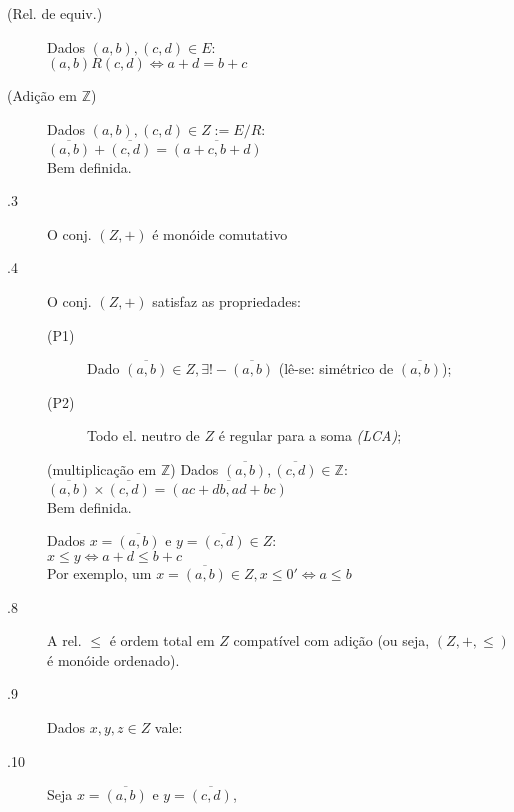 \documentclass[11pt]{article}
\newcommand{\Z}{\mathbb{Z}}
\begin{document}
\begin{description}
  \item[ (Rel. de equiv.)] Dados $(a,b),(c,d) \in E$: \\
    $(a,b)R(c,d) \iff a+d=b+c$
  \item[ (Adição em $\Z$)] Dados $(a,b),(c,d) \in Z := E/R$: \\
    $\overline{(a,b)} + \overline{(c,d)} = \overline{(a+c, b+d)}$ \\
    Bem definida.
  \item[.3] O conj. $(Z, +)$ é monóide comutativo
  \item[.4] O conj. $(Z, +)$ satisfaz as propriedades:
    \begin{description}
      \item[(P1)] Dado $\overline{(a,b)} \in Z, \exists ! -\overline{(a,b)}$
        (lê-se: simétrico de $\overline{(a,b)}$);
      \item[(P2)] Todo el. neutro de $Z$ é regular para a soma \emph{(LCA)};
      \end{description}
    \item[] (multiplicação em $\Z$) Dados $\overline{(a,b)},
      \overline{(c,d)} \in \Z$: \\
      $\overline{(a,b)} \times \overline{(c,d)} = \overline{(ac+db, ad+bc)}$ \\
      Bem definida.
    \item[] Dados $x=\overline{(a,b)}$ e $y = \overline{(c,d)} \in Z$: \\
      $x \leq y \iff a+d\leq b+c$ \\
      Por exemplo, um $x=\overline{(a,b)} \in Z, x\leq 0' \iff a\leq b$
    \item[.8] A rel. $\leq$ é ordem total em $Z$ compatível com adição (ou
      seja, $(Z, +, \leq)$ é monóide ordenado).
    \item[.9] Dados $x,y,z \in Z$ vale:
      \begin{description}
      \end{description}
    \item[.10] Seja $x=\overline{(a,b)}$ e $y=\overline{(c,d)}$,

\end{description}
\end{document}
